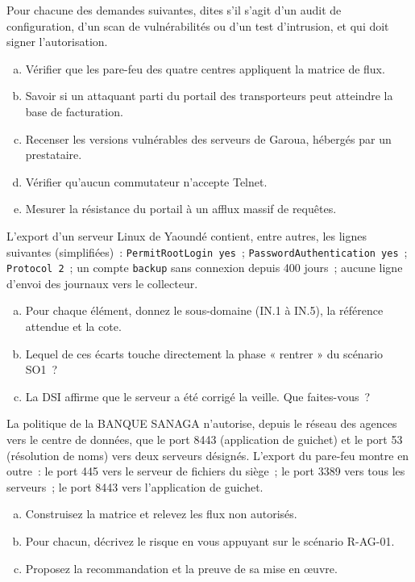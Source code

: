 \begin{boxexo}[title={\ding{45}\quad Exercice~12.1. Quelle activité, quelle autorisation~? \niveaubase}]
Pour chacune des demandes suivantes, dites s'il s'agit d'un audit de
configuration, d'un scan de vulnérabilités ou d'un test d'intrusion, et
qui doit signer l'autorisation.
\begin{enumerate}[(a)]
    \item Vérifier que les pare-feu des quatre centres appliquent la
          matrice de flux.
    \item Savoir si un attaquant parti du portail des transporteurs peut
          atteindre la base de facturation.
    \item Recenser les versions vulnérables des serveurs de Garoua,
          hébergés par un prestataire.
    \item Vérifier qu'aucun commutateur n'accepte Telnet.
    \item Mesurer la résistance du portail à un afflux massif de requêtes.
\end{enumerate}
\end{boxexo}

\begin{boxexo}[title={\ding{45}\quad Exercice~12.2. Lire un export \niveaumoyen}]
L'export d'un serveur Linux de Yaoundé contient, entre autres, les lignes
suivantes (simplifiées)~: \texttt{PermitRootLogin yes}~;
\texttt{PasswordAuthentication yes}~; \texttt{Protocol 2}~; un compte
\texttt{backup} sans connexion depuis 400 jours~; aucune ligne d'envoi des
journaux vers le collecteur.
\begin{enumerate}[(a)]
    \item Pour chaque élément, donnez le sous-domaine (IN.1 à IN.5), la
          référence attendue et la cote.
    \item Lequel de ces écarts touche directement la phase « rentrer » du
          scénario SO1~?
    \item La DSI affirme que le serveur a été corrigé la veille. Que faites-vous~?
\end{enumerate}
\end{boxexo}

\begin{boxexo}[title={\ding{45}\quad Exercice~12.3. Comparer les flux \niveaumoyen}]
La politique de la BANQUE SANAGA n'autorise, depuis le réseau des agences
vers le centre de données, que le port 8443 (application de guichet) et le
port 53 (résolution de noms) vers deux serveurs désignés. L'export du
pare-feu montre en outre~: le port 445 vers le serveur de fichiers du
siège~; le port 3389 vers tous les serveurs~; le port 8443 vers
l'application de guichet.
\begin{enumerate}[(a)]
    \item Construisez la matrice et relevez les flux non autorisés.
    \item Pour chacun, décrivez le risque en vous appuyant sur le scénario
          R-AG-01.
    \item Proposez la recommandation et la preuve de sa mise en œuvre.
\end{enumerate}
\end{boxexo}

